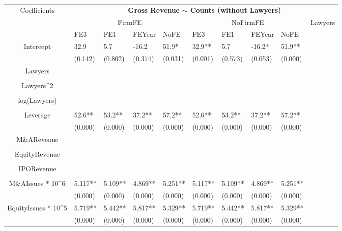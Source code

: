 \documentclass{article}
\begin{document}
\begin{table}[H]
\centering
\begin{tabular}{|clllllllll|}
\hline
\multirow{3}{*}{Coefficients} & \multicolumn{9}{c|}{\textbf{Gross Revenue $\sim$ Counts (without Lawyers)}} \\
\cline{2-10}
& \multicolumn{4}{c}{FirmFE} & \multicolumn{4}{c}{NoFirmFE} & \multirow{2}{*}{Lawyers} \\
\cline{2-9}
& FE3 & FE1 & FEYear & NoFE & FE3 & FE1 & FEYear & NoFE &  \\
\hline
 
Intercept & 32.9 & 5.7 & -16.2 & 51.9* & 32.9** & 5.7 & -16.2$^{+}$ & 51.9** & \\ 
   & (0.142) & (0.802) & (0.374) & (0.031) & (0.001) & (0.573) & (0.053) & (0.000) & \\ 
  Lawyers &  &  &  &  &  &  &  &  & \\ 
   &  &  &  &  &  &  &  &  & \\ 
  Lawyers^2 &  &  &  &  &  &  &  &  & \\ 
   &  &  &  &  &  &  &  &  & \\ 
  log(Lawyers) &  &  &  &  &  &  &  &  & \\ 
   &  &  &  &  &  &  &  &  & \\ 
  Leverage & 52.6** & 53.2** & 37.2** & 57.2** & 52.6** & 53.2** & 37.2** & 57.2** & \\ 
   & (0.000) & (0.000) & (0.000) & (0.000) & (0.000) & (0.000) & (0.000) & (0.000) & \\ 
  M\&ARevenue &  &  &  &  &  &  &  &  & \\ 
   &  &  &  &  &  &  &  &  & \\ 
  EquityRevenue &  &  &  &  &  &  &  &  & \\ 
   &  &  &  &  &  &  &  &  & \\ 
  IPORevenue &  &  &  &  &  &  &  &  & \\ 
   &  &  &  &  &  &  &  &  & \\ 
  M\&AIssues * 10^6 & 5.117** & 5.109** & 4.869** & 5.251** & 5.117** & 5.109** & 4.869** & 5.251** & \\ 
   & (0.000) & (0.000) & (0.000) & (0.000) & (0.000) & (0.000) & (0.000) & (0.000) & \\ 
  EquityIssues * 10^5 & 5.719** & 5.442** & 5.817** & 5.329** & 5.719** & 5.442** & 5.817** & 5.329** & \\ 
   & (0.000) & (0.000) & (0.000) & (0.000) & (0.000) & (0.000) & (0.000) & (0.000) & \\ 

\end{tabular}
\end{table}
\end{document}
